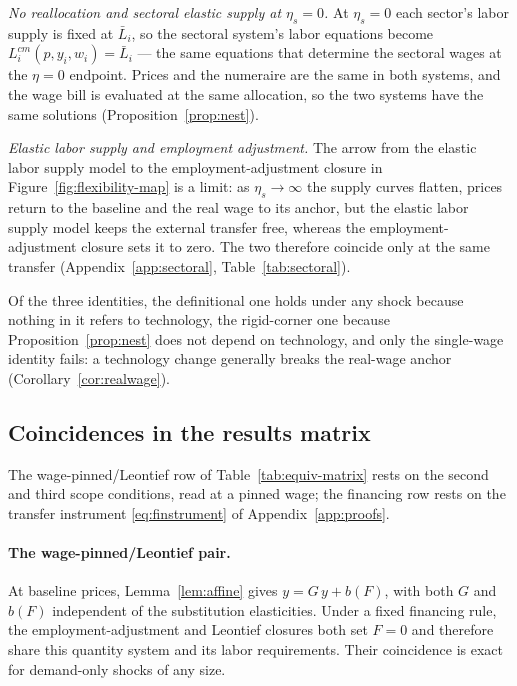 \emph{No reallocation and sectoral elastic supply at $\eta_s=0$.} At $\eta_s=0$ each sector's labor supply is fixed at
$\bar L_i$, so the sectoral system's labor equations become
$L^{cm}_i(p,y_i,w_i)=\bar L_i$ --- the same equations that determine the
sectoral wages at the $\eta=0$ endpoint. Prices and the numeraire are the same
in both systems, and the wage bill is evaluated at the same allocation, so the
two systems have the same solutions (Proposition~\ref{prop:nest}).

\emph{Elastic labor supply and employment adjustment.}
The arrow from the elastic labor supply model to the employment-adjustment closure in Figure~\ref{fig:flexibility-map} is a limit: as $\eta_s\to\infty$ the supply curves flatten, prices return to the baseline and the real wage to its anchor, but the elastic labor supply model keeps the external transfer free, whereas the employment-adjustment closure sets it to zero. The two therefore coincide only at the same transfer (Appendix~\ref{app:sectoral}, Table~\ref{tab:sectoral}).

Of the three identities, the definitional one holds under any shock because nothing in it refers to technology, the rigid-corner one because Proposition~\ref{prop:nest}
does not depend on technology, and only the single-wage identity fails:
a technology change generally breaks the real-wage anchor
(Corollary~\ref{cor:realwage}).

\subsection*{Coincidences in the results matrix}

The wage-pinned/Leontief row of Table~\ref{tab:equiv-matrix} rests on the
second and third scope conditions, read at a pinned wage; the financing row rests on the transfer instrument
\eqref{eq:finstrument} of Appendix~\ref{app:proofs}.



\paragraph{The wage-pinned/Leontief pair.} At baseline prices, Lemma~\ref{lem:affine}
gives $y = G\,y + b(F)$, with both $G$ and $b(F)$ independent of the
substitution elasticities. Under a fixed financing rule, the
employment-adjustment and Leontief closures both set $F = 0$ and therefore
share this quantity system and its labor requirements. Their coincidence is
exact for demand-only shocks of any size.

